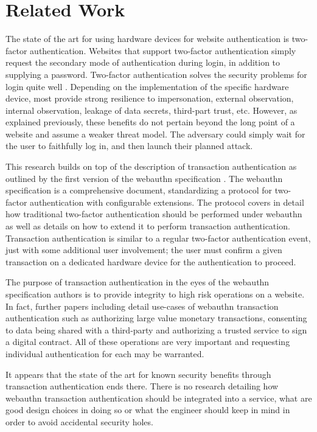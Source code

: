 \chapter{Related Work}


The state of the art for using hardware devices for website authentication is two-factor authentication. Websites that support two-factor authentication simply request the secondary mode of authentication during login, in addition to supplying a password. Two-factor authentication solves the security problems for login quite well \cite{TODO-quest-to-remove-passwords}. Depending on the implementation of the specific hardware device, most provide strong resilience to impersonation, external observation, internal observation, leakage of data secrets, third-part trust, etc. However, as explained previously, these benefits do not pertain beyond the long point of a website and assume a weaker threat model. The adversary could simply wait for the user to faithfully log in, and then launch their planned attack. 

This research builds on top of the description of transaction authentication as outlined by the first version of the webauthn specification \cite{webauthn}. The webauthn specification is a comprehensive document, standardizing a protocol for two-factor authentication with configurable extensions. The protocol covers in detail how traditional two-factor authentication should be performed under webauthn as well as details on how to extend it to perform transaction authentication. Transaction authentication is similar to a regular two-factor authentication event, just with some additional user involvement; the user must confirm a given transaction on a dedicated hardware device for the authentication to proceed. 

The purpose of transaction authentication in the eyes of the webauthn specification authors is to provide integrity to high risk operations on a website. In fact, further papers including \cite{EuroFIDO} detail use-cases of webauthn transaction authentication such as authorizing large value monetary transactions, consenting to data being shared with a third-party and authorizing a trusted service to sign a digital contract. All of these operations are very important and requesting individual authentication for each may be warranted. 

It appears that the state of the art for known security benefits through transaction authentication ends there. There is no research detailing how webauthn transaction authentication should be integrated into a service, what are good design choices in doing so or what the engineer should keep in mind in order to avoid accidental security holes.

\iffalse

\fi

